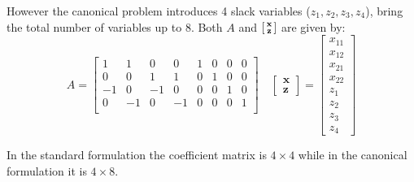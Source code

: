 \documentclass{article}
\newcommand{\icol}[1]{%
  \begin{bsmallmatrix}#1\end{bsmallmatrix}%
}
\renewcommand\vec{\mathbf}
\begin{document}
However the canonical problem introduces 4 slack variables ($z_1,z_2,z_3,z_4$), bring the total number of variables up to 8. Both $A$ and $\icol{\vec x\\\vec z}$ are given by:
$$A=\begin{bmatrix}
    1&1&0&0&1&0&0&0\\0&0&1&1&0&1&0&0\\-1&0&-1&0&0&0&1&0\\0&-1&0&-1&0&0&0&1\\
\end{bmatrix}\quad \begin{bmatrix}
    \vec x\\\vec z
\end{bmatrix}=\begin{bmatrix}
    x_{11}\\x_{12}\\x_{21}\\x_{22}\\z_1\\z_2\\z_3\\z_4
\end{bmatrix}$$

In the standard formulation the coefficient matrix is $4\times 4$ while in the canonical formulation it is $4\times 8$.
\end{document}
